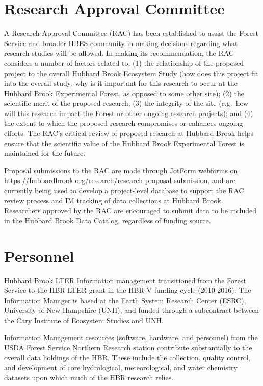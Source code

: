 \documentclass[
  letterpaper,
  DIV=11,
  numbers=noendperiod]{scrreprt}
\begin{document}
\section{Research Approval Committee}\label{research-approval-committee}

A Research Approval Committee (RAC) has been established to assist the
Forest Service and broader HBES community in making decisions regarding
what research studies will be allowed. In making its recommendation, the
RAC considers a number of factors related to: (1) the relationship of
the proposed project to the overall Hubbard Brook Ecosystem Study (how
does this project fit into the overall study; why is it important for
this research to occur at the Hubbard Brook Experimental Forest, as
opposed to some other site); (2) the scientific merit of the proposed
research; (3) the integrity of the site (e.g.~how will this research
impact the Forest or other ongoing research projects); and (4) the
extent to which the proposed research compromises or enhances ongoing
efforts. The RAC's critical review of proposed research at Hubbard Brook
helps ensure that the scientific value of the Hubbard Brook Experimental
Forest is maintained for the future.

Proposal submissions to the RAC are made through JotForm webforms on
\url{https://hubbardbrook.org/research/research-proposal-submission},
and are currently being used to develop a project-level database to
support the RAC review process and IM tracking of data collections at
Hubbard Brook. Researchers approved by the RAC are encouraged to submit
data to be included in the Hubbard Brook Data Catalog, regardless of
funding source.

\section{Personnel}\label{personnel}

Hubbard Brook LTER Information management transitioned from the Forest
Service to the HBR LTER grant in the HBR-V funding cycle (2010-2016).
The Information Manager is based at the Earth System Research Center
(ESRC), University of New Hampshire (UNH), and funded through a
subcontract between the Cary Institute of Ecosystem Studies and UNH.

Information Management resources (software, hardware, and personnel)
from the USDA Forest Service Northern Research station contribute
substantially to the overall data holdings of the HBR. These include the
collection, quality control, and development of core hydrological,
meteorological, and water chemistry datasets upon which much of the HBR
research relies.
\end{document}
